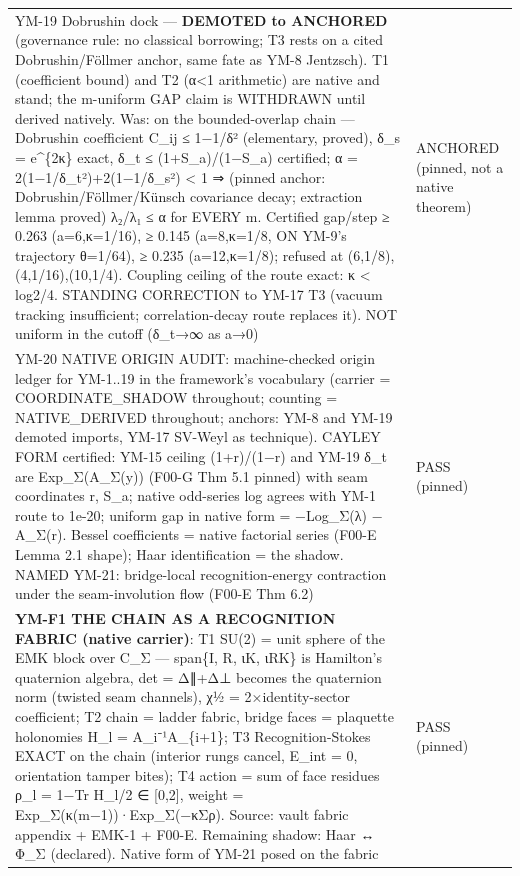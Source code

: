 \begin{longtable}[]{@{}
  >{\raggedright\arraybackslash}p{}
  >{\raggedright\arraybackslash}p{}@{}}
YM-19 Dobrushin dock --- \textbf{DEMOTED to ANCHORED} (governance rule: no classical borrowing; T3 rests on a cited Dobrushin/Föllmer anchor, same fate as YM-8 Jentzsch). T1 (coefficient bound) and T2 (α\textless1 arithmetic) are native and stand; the m-uniform GAP claim is WITHDRAWN until derived natively. Was: on the bounded-overlap chain --- Dobrushin coefficient C\_ij ≤ 1−1/δ² (elementary, proved), δ\_s = e\^{}\{2κ\} exact, δ\_t ≤ (1+S\_a)/(1−S\_a) certified; α = 2(1−1/δ\_t²)+2(1−1/δ\_s²) \textless{} 1 ⇒ (pinned anchor: Dobrushin/Föllmer/Künsch covariance decay; extraction lemma proved) λ₂/λ₁ ≤ α for EVERY m. Certified gap/step ≥ 0.263 (a=6,κ=1/16), ≥ 0.145 (a=8,κ=1/8, ON YM-9's trajectory θ=1/64), ≥ 0.235 (a=12,κ=1/8); refused at (6,1/8),(4,1/16),(10,1/4). Coupling ceiling of the route exact: κ \textless{} log2/4. STANDING CORRECTION to YM-17 T3 (vacuum tracking insufficient; correlation-decay route replaces it). NOT uniform in the cutoff (δ\_t→∞ as a→0) & ANCHORED (pinned, not a native theorem) \\
YM-20 NATIVE ORIGIN AUDIT: machine-checked origin ledger for YM-1..19 in the framework's vocabulary (carrier = COORDINATE\_SHADOW throughout; counting = NATIVE\_DERIVED throughout; anchors: YM-8 and YM-19 demoted imports, YM-17 SV-Weyl as technique). CAYLEY FORM certified: YM-15 ceiling (1+r)/(1−r) and YM-19 δ\_t are Exp\_Σ(A\_Σ(y)) (F00-G Thm 5.1 pinned) with seam coordinates r, S\_a; native odd-series log agrees with YM-1 route to 1e-20; uniform gap in native form = −Log\_Σ(λ) − A\_Σ(r). Bessel coefficients = native factorial series (F00-E Lemma 2.1 shape); Haar identification = the shadow. NAMED YM-21: bridge-local recognition-energy contraction under the seam-involution flow (F00-E Thm 6.2) & PASS (pinned) \\
\textbf{YM-F1 THE CHAIN AS A RECOGNITION FABRIC (native carrier)}: T1 SU(2) = unit sphere of the EMK block over C\_Σ --- span\{I, R, ιK, ιRK\} is Hamilton's quaternion algebra, det = Δ∥+Δ⊥ becomes the quaternion norm (twisted seam channels), χ½ = 2×identity-sector coefficient; T2 chain = ladder fabric, bridge faces = plaquette holonomies H\_l = A\_i⁻¹A\_\{i+1\}; T3 Recognition-Stokes EXACT on the chain (interior rungs cancel, E\_int = 0, orientation tamper bites); T4 action = sum of face residues ρ\_l = 1−Tr H\_l/2 ∈ {[}0,2{]}, weight = Exp\_Σ(κ(m−1))·Exp\_Σ(−κΣρ). Source: vault fabric appendix + EMK-1 + F00-E. Remaining shadow: Haar ↔ Φ\_Σ (declared). Native form of YM-21 posed on the fabric & PASS (pinned) \\

\end{longtable}
